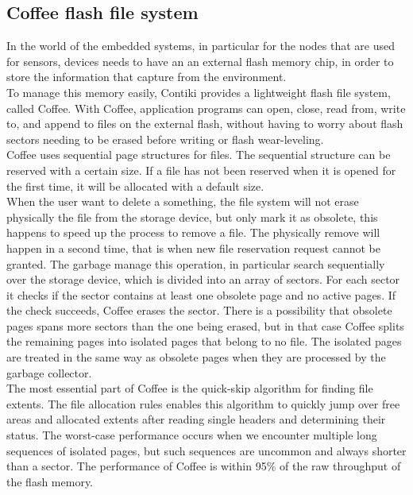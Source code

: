 \documentclass[a4paper,10pt]{article}
\begin{document}
\begin{multicols}{2}
\subsection{Coffee flash file system}

In the world of the embedded systems, in particular for the nodes that are used for sensors,
 devices needs to have an an external flash memory chip, in order to store the information that capture from the environment.\\ To manage this memory easily, Contiki provides a lightweight flash file system, called Coffee.
With Coffee, application programs can open, close, read from, write to, and append to files on
 the external flash, without having to worry about flash sectors needing to be erased before
 writing or flash wear-leveling.\\Coffee uses sequential page structures for files. The sequential 
structure can be reserved with a certain size. If a file has not been reserved when it is opened for
 the first time, it will be allocated with a default size.\\ When the user want to delete a something,
 the file system will not erase physically the file from the storage device, but only mark it as obsolete,
 this happens to speed up the process to remove a file. The physically remove will happen in a second time,
 that is when new file reservation request cannot be granted. The garbage manage this operation,
 in particular search sequentially over the storage device, which is divided into an array of sectors.
 For each sector it checks if the sector contains at least one obsolete page and no active pages. If 
the check succeeds, Coffee erases the sector. There is a possibility that obsolete pages spans more 
sectors than the one being erased, but in that case Coffee splits the remaining pages into isolated pages
 that belong to no file. The isolated pages are treated in the same way as obsolete pages when they are processed by the garbage collector.\\ The most essential part of Coffee is the quick-skip algorithm for finding file
 extents. The file allocation rules enables this algorithm to quickly jump over free areas and 
allocated extents after reading single headers and determining their status. The worst-case 
performance occurs when we encounter multiple long sequences of isolated pages, but such
 sequences are uncommon and always shorter than a sector.
The performance of Coffee is within 95\% \cite{site} of the raw throughput of the flash memory.





\end{multicols}
\end{document}
